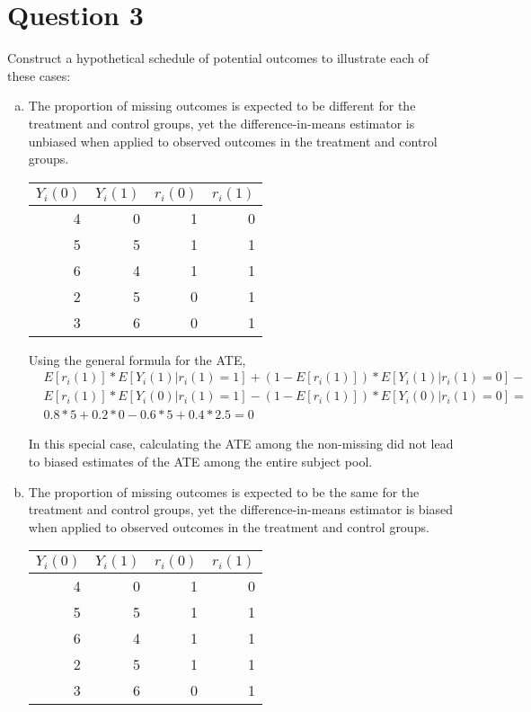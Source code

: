 \documentclass[11pt,notitlepage]{article}\usepackage[]{graphicx}\usepackage[]{color}
\begin{document}
\section*{Question 3}
Construct a hypothetical schedule of potential outcomes to illustrate each of these cases:
\begin{enumerate}[a)]
\item The proportion of missing outcomes is expected to be different for the treatment and control groups, yet the difference-in-means estimator is unbiased when applied to observed outcomes in the treatment and control groups.

\begin{table}[htbp]
  \centering
    \begin{tabular}{rrrr}
    \toprule
    $Y_i(0)$ & $Y_i(1)$ & $r_i(0)$ & $r_i(1)$ \\
    \midrule
    4     & 0     & 1     & 0 \\
    5     & 5     & 1     & 1 \\
    6     & 4     & 1     & 1 \\
    2     & 5     & 0     & 1 \\
    3     & 6     & 0     & 1 \\
    \bottomrule
    \end{tabular}%
  \label{tab:addlabel}%
\end{table}%

Using the general formula for the ATE,
\begin{align*}
& E[r_i(1)] * E[Y_i(1)|r_i(1)=1] + (1-E[r_i(1)])*E[Y_i(1)|r_i(1)=0] - \\
& E[r_i(1)] * E[Y_i(0)|r_i(1)=1]-(1-E[r_i(1)])*E[Y_i(0)|r_i(1)=0] =\\
& 0.8 * 5 + 0.2 * 0 - 0.6*5 + 0.4*2.5 = 0
\end{align*}

In this special case, calculating the ATE among the non-missing did not lead to biased estimates of the ATE among the entire subject pool.

\item The proportion of missing outcomes is expected to be the same for the treatment and control groups, yet the difference-in-means estimator is biased when applied to observed outcomes in the treatment and control groups.

\begin{table}[H]
  \centering
    \begin{tabular}{rrrr}
    \toprule
    $Y_i(0)$ & $Y_i(1)$ & $r_i(0)$ & $r_i(1)$ \\
    \midrule
    4     & 0     & 1     & 0 \\
    5     & 5     & 1     & 1 \\
    6     & 4     & 1     & 1 \\
    2     & 5     & 1     & 1 \\
    3     & 6     & 0     & 1 \\
    \bottomrule
    \end{tabular}%
  \label{tab:addlabel}%
\end{table}%
\end{enumerate}
\end{document}
